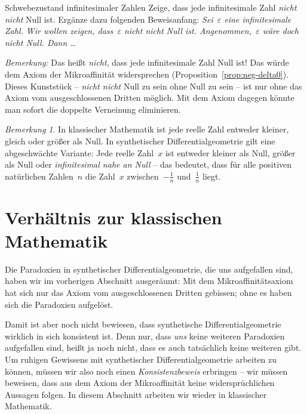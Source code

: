 \documentclass[twoside]{../zirkelblatt}
\theoremstyle{definition}
\theoremstyle{plain}
\theoremstyle{remark}
\newtheorem{bem}[defn]{Bemerkung}
\begin{document}
\begin{aufgabeShaded}{Schwebezustand infinitesimaler Zahlen}
\label{aufg:schwebezustand}
Zeige, dass jede infinitesimale Zahl \emph{nicht nicht} Null ist. Ergänze dazu
folgenden Be\-weis\-an\-fang:
\emph{Sei~$\varepsilon$ eine infinitesimale Zahl. Wir wollen zeigen,
dass~$\varepsilon$ \emph{nicht nicht} Null ist. Angenommen,~$\varepsilon$ wäre
doch nicht Null. Dann \ldots}

\emph{Bemerkung:} Das heißt \emph{nicht}, dass jede infinitesimale Zahl Null
ist! Das würde dem Axiom der Mikroaffinität widersprechen
(Proposition~\ref{prop:neg-delta0}). Dieses Kunststück -- \emph{nicht nicht}
Null zu sein ohne Null zu sein -- ist nur ohne das Axiom vom ausgeschlossenen
Dritten möglich. Mit dem Axiom dagegen könnte man sofort die doppelte
Verneinung eliminieren.
\end{aufgabeShaded}

\begin{bem}In klassischer Mathematik ist jede reelle Zahl entweder kleiner,
gleich oder größer als Null. In synthetischer Differentialgeometrie gilt eine
abgeschwächte Variante: Jede reelle Zahl~$x$ ist entweder kleiner als Null, größer
als Null oder \emph{infinitesimal nahe an Null} -- das bedeutet, dass
für alle positiven natürlichen Zahlen~$n$ die Zahl~$x$ zwischen~$-\frac{1}{n}$
und~$\frac{1}{n}$ liegt.
\end{bem}


\section{Verhältnis zur klassischen Mathematik}

Die Paradoxien in synthetischer Differentialgeometrie, die uns aufgefallen
sind, haben wir im vorherigen Abschnitt ausgeräumt: Mit dem
Mikroaffinitätsaxiom hat sich nur das Axiom vom ausgeschlossenen Dritten
gebissen; ohne es haben sich die Paradoxien aufgelöst.

Damit ist aber noch nicht bewiesen, dass synthetische Differentialgeometrie
wirklich in sich konsistent ist. Denn nur, dass \emph{uns} keine weiteren
Paradoxien aufgefallen sind, heißt ja noch nicht, dass es auch tatsächlich
keine weiteren gibt. Um ruhigen Gewissens mit synthetischer Differentialgeometrie
arbeiten zu können, müssen wir also noch einen \emph{Konsistenzbeweis}
erbringen -- wir müssen beweisen, dass aus dem Axiom der Mikroaffinität
keine widersprüchlichen Aussagen folgen. In diesem Abschnitt arbeiten wir
wieder in klassischer Mathematik.
\end{document}
